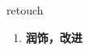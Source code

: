 
\begin{frame}
{\huge retouch}
\begin{center}
\begin{enumerate}\Large
  \item \textbf{润饰，改进}
\end{enumerate}
\end{center}
\end{frame}
